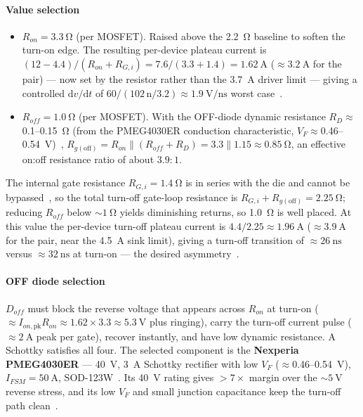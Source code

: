 \documentclass[journal,onecolumn,11pt]{IEEEtran}
\begin{document}
\paragraph{Value selection}
\begin{itemize}[leftmargin=1.4em]
  \item $R_{on}=\SI{3.3}{\ohm}$ (per MOSFET). Raised above the \SI{2.2}{\ohm} baseline to soften the
        turn-on edge. The resulting per-device plateau current is
        $(12-4.4)/(R_{on}+R_{G,i})=7.6/(3.3+1.4)=\SI{1.62}{\ampere}$ ($\approx\SI{3.2}{\ampere}$ for
        the pair) --- now set by the resistor rather than the \SI{3.7}{\ampere} driver limit --- giving
        a controlled $\mathrm{d}v/\mathrm{d}t$ of $60/(102\,\mathrm{n}/3.2)\approx\SI{1.9}{\volt\per\nano\second}$
        worst case~\cite{ipt015ds,ucc27211}.
  \item $R_{off}=\SI{1.0}{\ohm}$ (per MOSFET). With the OFF-diode dynamic resistance
        $R_{D}\approx$0.1--\SI{0.15}{\ohm} (from the PMEG4030ER conduction characteristic,
        $V_F\approx$0.46--\SI{0.54}{\volt})~\cite{pmeg4030er},
        $R_{g(\mathrm{off})}=R_{on}\parallel(R_{off}+R_D)=3.3\parallel1.15\approx\SI{0.85}{\ohm}$, an
        effective on:off resistance ratio of about $3.9\!:\!1$.
\end{itemize}
The internal gate resistance $R_{G,i}=\SI{1.4}{\ohm}$ is in series with the die and cannot be
bypassed~\cite{ipt015ds}, so the total turn-off gate-loop resistance is
$R_{G,i}+R_{g(\mathrm{off})}=\SI{2.25}{\ohm}$; reducing $R_{off}$ below $\sim\SI{1}{\ohm}$ yields
diminishing returns, so \SI{1.0}{\ohm} is well placed. At this value the per-device turn-off plateau
current is $4.4/2.25\approx\SI{1.96}{\ampere}$ ($\approx\SI{3.9}{\ampere}$ for the pair, near the
\SI{4.5}{\ampere} sink limit), giving a turn-off transition of $\approx\SI{26}{\nano\second}$ versus
$\approx\SI{32}{\nano\second}$ at turn-on --- the desired asymmetry~\cite{ucc27211}.

\paragraph{OFF diode selection}
$D_{off}$ must block the reverse voltage that appears across $R_{on}$ at turn-on
($\approx I_{on,\mathrm{pk}}R_{on}\approx 1.62\times3.3\approx\SI{5.3}{\volt}$ plus ringing), carry
the turn-off current pulse ($\approx\SI{2}{\ampere}$ peak per gate), recover instantly, and have low
dynamic resistance. A Schottky satisfies all four. The selected component is the \textbf{Nexperia
PMEG4030ER} --- \SI{40}{\volt}, \SI{3}{\ampere} Schottky rectifier with low $V_F$ ($\approx$0.46--\SI{0.54}{\volt}),
$I_{FSM}=\SI{50}{\ampere}$, SOD-123W~\cite{pmeg4030er}. Its \SI{40}{\volt} rating gives $>7\times$
margin over the $\sim\SI{5}{\volt}$ reverse stress, and its low $V_F$ and small junction capacitance
keep the turn-off path clean~\cite{pmeg4030er}.
\end{document}
